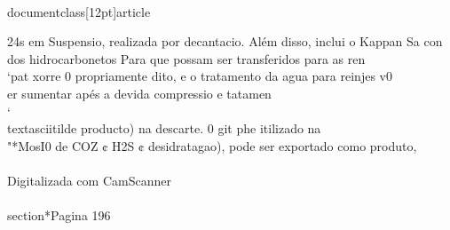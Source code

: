 \\documentclass[12pt]{article}
\begin{document}
{24s em Suspensio, realizada por decantacio. Além disso, inclui o Kappan Sa con\\
dos hidrocarbonetos Para que possam ser transferidos para as ren\\
‘pat xorre 0 propriamente dito, e o tratamento da agua para reinjes v0\\
er sumentar apés a devida compressio e tatamen\\
‘ \\textasciitilde{} producto) na descarte. 0 git phe itilizado na\\
"*MosI0 de COZ ¢ H2S ¢ desidratagao), pode ser exportado como produto,\\
\\
Digitalizada com CamScanner\\

\\section*{Pagina 196}

}
\end{document}
